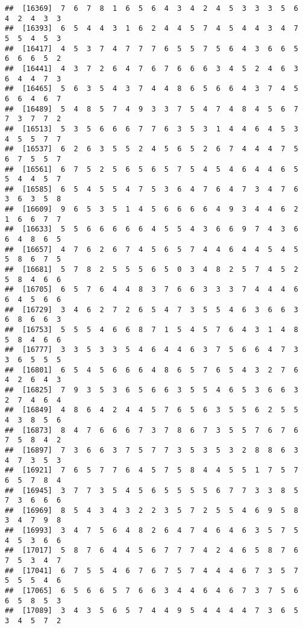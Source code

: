 \documentclass[
]{book}
\begin{document}
\begin{verbatim}
##  [16369]  7  6  7  8  1  6  5  6  4  3  4  2  4  5  3  3  3  5  6  4  2  4  3  3
##  [16393]  6  5  4  4  3  1  6  2  4  4  5  7  4  5  4  4  3  4  7  5  5  4  5  3
##  [16417]  4  5  3  7  4  7  7  7  6  5  5  7  5  6  4  3  6  6  5  6  6  6  5  2
##  [16441]  4  3  7  2  6  4  7  6  7  6  6  6  3  4  5  2  4  6  3  6  4  4  7  3
##  [16465]  5  6  3  5  4  3  7  4  4  8  6  5  6  6  4  3  7  4  5  6  6  4  6  7
##  [16489]  5  4  8  5  7  4  9  3  3  7  5  4  7  4  8  4  5  6  7  7  3  7  7  2
##  [16513]  5  3  5  6  6  6  7  7  6  3  5  3  1  4  4  6  4  5  3  4  5  5  7  7
##  [16537]  6  2  6  3  5  5  2  4  5  6  5  2  6  7  4  4  4  7  5  6  7  5  5  7
##  [16561]  6  7  5  2  5  6  5  6  5  7  5  4  5  4  6  4  4  6  5  5  4  4  5  7
##  [16585]  6  5  4  5  5  4  7  5  3  6  4  7  6  4  7  3  4  7  6  3  6  3  5  8
##  [16609]  9  6  5  3  5  1  4  5  6  6  6  6  4  9  3  4  4  6  2  1  6  6  7  7
##  [16633]  5  5  6  6  6  6  6  4  5  5  4  3  6  6  9  7  4  3  6  6  4  8  6  5
##  [16657]  4  7  6  2  6  7  4  5  6  5  7  4  4  6  4  4  5  4  5  5  8  6  7  5
##  [16681]  5  7  8  2  5  5  5  6  5  0  3  4  8  2  5  7  4  5  2  5  8  4  6  6
##  [16705]  6  5  7  6  4  4  8  3  7  6  6  3  3  3  7  4  4  4  6  6  4  5  6  6
##  [16729]  3  4  6  2  7  2  6  5  4  7  3  5  5  4  6  3  6  6  3  6  8  6  6  3
##  [16753]  5  5  5  4  6  6  8  7  1  5  4  5  7  6  4  3  1  4  8  5  8  4  6  6
##  [16777]  3  3  5  3  3  5  4  6  4  4  6  3  7  5  6  6  4  7  3  3  6  5  5  5
##  [16801]  6  5  4  5  6  6  6  4  8  6  5  7  6  5  4  3  2  7  6  4  2  6  4  3
##  [16825]  7  9  3  5  3  6  5  6  6  3  5  5  4  6  5  3  6  6  3  2  7  4  6  4
##  [16849]  4  8  6  4  2  4  4  5  7  6  5  6  3  5  5  6  2  5  5  4  3  8  5  6
##  [16873]  8  4  7  6  6  6  7  3  7  8  6  7  3  5  5  7  6  7  6  7  5  8  4  2
##  [16897]  7  3  6  6  3  7  5  7  7  3  5  3  5  3  2  8  8  6  3  4  7  3  5  3
##  [16921]  7  6  5  7  7  6  4  5  7  5  8  4  4  5  5  1  7  5  7  6  5  7  8  4
##  [16945]  3  7  7  3  5  4  5  6  5  5  5  5  6  7  7  3  3  8  5  7  3  6  6  6
##  [16969]  8  5  4  3  4  3  2  2  3  5  7  2  5  5  4  6  9  5  8  3  4  7  9  8
##  [16993]  3  4  7  5  6  4  8  2  6  4  7  4  6  4  6  3  5  7  5  4  5  3  6  6
##  [17017]  5  8  7  6  4  4  5  6  7  7  7  4  2  4  6  5  8  7  6  7  5  3  4  7
##  [17041]  6  7  5  5  4  6  7  6  7  5  7  4  4  4  6  7  3  5  7  5  5  5  4  6
##  [17065]  6  5  6  6  5  7  6  6  3  4  4  6  4  6  7  3  7  5  6  6  5  8  5  3
##  [17089]  3  4  3  5  6  5  7  4  4  9  5  4  4  4  4  7  3  6  5  3  4  5  7  2

\end{verbatim}
\end{document}
